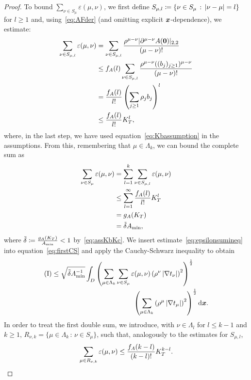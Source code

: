 \begin{proof}
	To bound $\sum_{\nu \in S_\mu} \varepsilon(\mu, \nu)$, we first define $S_{\mu, l} \coloneqq \{\nu \in S_\mu\,:\, \left|\nu - \mu\right| = l \}$ for $l\geq 1$ and, using~\eqref{eq:AFder} (and omitting explicit ${{\bm{x}}}$-dependence), we estimate:
	\begin{align}
		\sum_{\nu \in S_{\mu, l}} \varepsilon(\mu, \nu) &= \sum_{\nu \in S_{\mu, l}} \frac{\rho^{\mu - \nu}|\partial^{\mu-\nu}{A}(\bm{0})|_{2,2}}{ (\mu - \nu)!}\\
		&\leq f_A(l) \sum_{\nu \in S_{\mu, l}} \frac{\rho^{\mu - \nu} ((b_j)_{j \geq 1})^{\mu - \nu} }{ (\mu - \nu)!} \nonumber\\
		&=  \frac{f_A(l)}{l!} \left( \sum_{j \geq 1} \rho_j b_j     \right)^l  \\& \leq   \frac{f_A(l)}{l!} K_T^l,\label{eq:enddouble}
	\end{align}
	where, in the last step, we have used equation~\eqref{eq:Kbassumption} in the assumptions.
	From this, remembering that $\mu\in\Lambda_k$, we can bound the complete sum as
	\begin{align}
		\sum_{\nu \in S_{\mu}} \varepsilon(\mu, \nu) &= \sum_{l=1}^k \sum_{\nu \in S_{\mu, l}} \varepsilon(\mu, \nu)\\
		&\leq  \sum_{l=1}^\infty \frac{f_A(l)}{l!} K_T^l\\
		&= g_A(K_T)\\
		&= {\tilde{\delta}} A_{\min},   \label{eq:epsilonsumineq}
	\end{align}
	where ${\tilde{\delta}} \coloneqq  \frac{g_A(K_T)}{A_{\min}} < 1$ by~\eqref{eq:assKbKc}.
	We insert estimate~\eqref{eq:epsilonsumineq} into equation~\eqref{eq:firstCS} and apply the Cauchy-Schwarz inequality to obtain
	\begin{align}
	(\text{I}) &\leq  \sqrt{ {\tilde{\delta}}  A_{\min}^{-1}} \int_{{D}} \left(\sum_{\mu \in \Lambda_k}\sum_{\nu \in S_\mu}    \varepsilon(\mu, \nu)  \left( \rho^\nu\left|\nabla  t_\nu\right|\right)^2 \right)^{\frac{1}{2 }}\\&\qquad\qquad\qquad\qquad\qquad\qquad\left( \sum_{\mu \in \Lambda_k} \left(\rho^\mu \left|\nabla t_\mu\right|\right)^2\right)^{\frac{1}{2 }} \mathrm{d}{{\bm{x}}}. \label{eq:secondCS}
	\end{align}
	In order to treat the first double sum, we introduce, with $\nu \in \Lambda_l$ for $l\leq k-1$ and $k \geq 1$, $R_{\nu, k} = \{\mu \in \Lambda_k\, :\, \nu \in S_{\mu}\}$, such that, analogously to the estimates for $S_{\mu, l}$,
	\begin{align}
		\sum_{\mu \in R_{\nu, k}} \varepsilon(\mu, \nu)
		\leq \frac{f_A(k-l)}{(k-l)!}\Kb^{k-l}.\label{eq:secondepsineq}

\end{align}
\end{proof}

